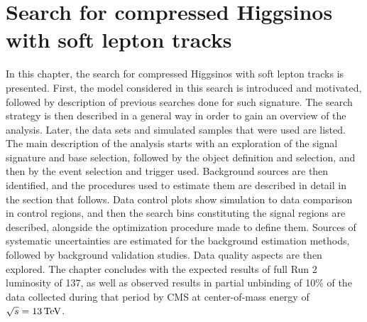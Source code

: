 \chapter{Search for compressed Higgsinos with soft lepton tracks}
\label{sec:search}

In this chapter, the search for compressed Higgsinos with soft lepton tracks is presented.
First, the model considered in this search is introduced and motivated, followed by description of previous searches done for such signature. The search strategy is then described in a general way in order to gain an overview of the analysis. Later, the data sets and simulated samples that were used are listed. The main description of the analysis starts with an exploration of the signal signature and base selection, followed by the object definition and selection, and then by the event selection and trigger used. Background sources are then identified, and the procedures used to estimate them are described in detail in the section that follows. Data control plots show simulation to data comparison in control regions, and then the search bins constituting the signal regions are described, alongside the optimization procedure made to define them. Sources of systematic uncertainties are estimated
for the background estimation methods, followed by background validation studies. Data quality aspects are then explored. The chapter concludes with the expected results of full Run 2 luminosity of 137\fbinv, as well as observed results in partial unbinding of 10\% of the data collected during that period by CMS at center-of-mass energy of $\sqrt{s}=13\,\text{Te\hspace{-.08em}V}$.






























